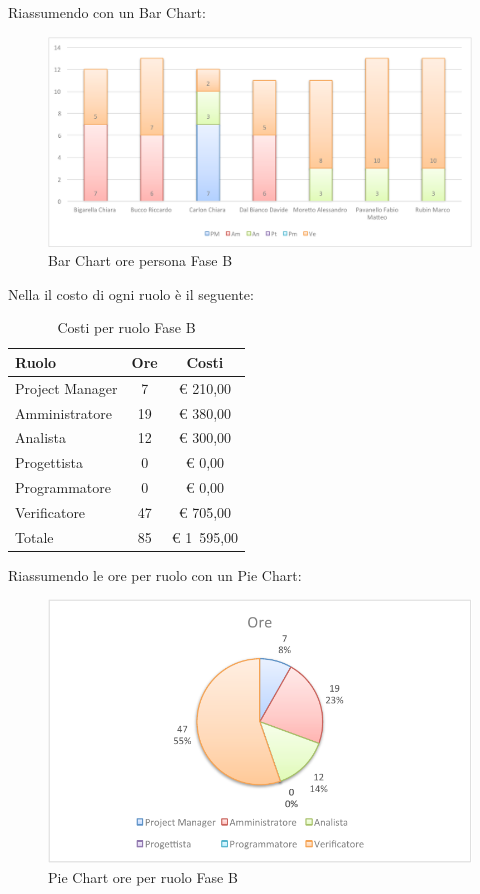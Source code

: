 				Riassumendo con un Bar Chart:
				\begin{figure}[H]\centering
					\includegraphics[width=\textwidth]{PianoDiProgetto/Pics/ChartOreFaseB.pdf}
					\caption{Bar Chart ore persona Fase B}
				\end{figure}
				Nella  il costo di ogni ruolo è il seguente:
				\begin{table}[H]
					\begin{center}
						\begin{tabular}{| l | c | c |}
							\hline
							Ruolo 				& Ore 	& Costi  \\ \hline
						
							Project Manager		& 7 	& \euro{} 210,00 	\\
							Amministratore 		& 19 	& \euro{} 380,00 	\\
							Analista	 		& 12 	& \euro{} 300,00 	\\
							Progettista 		& 0		& \euro{} 0,00 		\\
							Programmatore		& 0		& \euro{} 0,00		\\
							Verificatore		& 47 	& \euro{} 705,00 	\\ \hline \hline
							
							Totale	 			& 85 	& \euro{} 1~595,00 	\\ \hline
						\end{tabular}
					\end{center}
					\caption{Costi per ruolo Fase B}
				\end{table}
				Riassumendo le ore per ruolo con un Pie Chart:
				\begin{figure}[H]\centering
					\includegraphics[width=\textwidth]{PianoDiProgetto/Pics/ChartTotOreFaseB.pdf}
					\caption{Pie Chart ore per ruolo Fase B}
				\end{figure}
